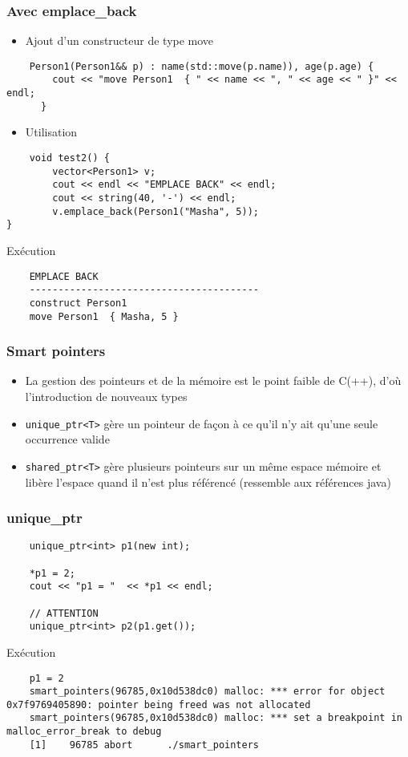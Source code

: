 \begin{frame}[fragile]
\frametitle{Avec emplace\_back}
\begin{itemize}
    \item Ajout d'un constructeur de type move
\end{itemize}
\begin{lstlisting}
    Person1(Person1&& p) : name(std::move(p.name)), age(p.age) {
        cout << "move Person1  { " << name << ", " << age << " }" << endl;
      }
\end{lstlisting}
\begin{itemize}
    \item Utilisation
\end{itemize}
\begin{lstlisting}
    void test2() {
        vector<Person1> v;
        cout << endl << "EMPLACE BACK" << endl; 
        cout << string(40, '-') << endl;
        v.emplace_back(Person1("Masha", 5));
}    
\end{lstlisting}
\begin{exampleblock}{Exécution}
{\tiny 
\begin{verbatim}
    EMPLACE BACK
    ----------------------------------------
    construct Person1
    move Person1  { Masha, 5 }
\end{verbatim}
}
\end{exampleblock}
\end{frame}

\begin{frame}[fragile]
\frametitle{Smart pointers}
    \begin{itemize}
        \item La gestion des pointeurs et de la mémoire est le point faible de C(++), d'où l'introduction de nouveaux types 
        \item \texttt{unique\_ptr<T>} gère un pointeur de façon à ce qu'il n'y ait qu'une seule occurrence valide 
        \item \texttt{shared\_ptr<T>} gère plusieurs pointeurs sur un même espace mémoire et libère l'espace quand il n'est plus référencé (ressemble aux références java)
    \end{itemize}
\end{frame}

\begin{frame}[fragile]
\frametitle{unique\_ptr}
\begin{lstlisting}
    unique_ptr<int> p1(new int); 

    *p1 = 2;
    cout << "p1 = "  << *p1 << endl;

    // ATTENTION
    unique_ptr<int> p2(p1.get());
\end{lstlisting}
\begin{exampleblock}{Exécution}
    {\tiny
    \begin{verbatim}        
    p1 = 2
    smart_pointers(96785,0x10d538dc0) malloc: *** error for object 0x7f9769405890: pointer being freed was not allocated
    smart_pointers(96785,0x10d538dc0) malloc: *** set a breakpoint in malloc_error_break to debug
    [1]    96785 abort      ./smart_pointers    
\end{verbatim}
    }
\end{exampleblock}
\end{frame}

